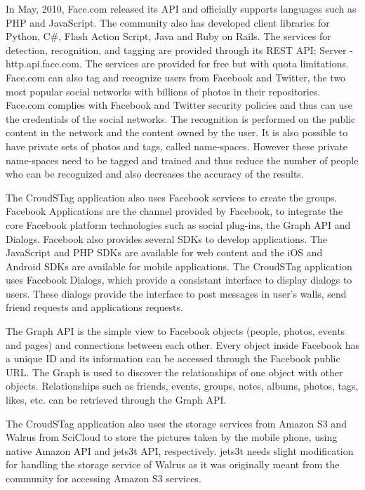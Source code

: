 In May, 2010, Face.com released its API and officially supports languages such as PHP and JavaScript. The community also has developed client libraries for Python, C\#, Flash Action Script, Java and Ruby on Rails. The services for detection, recognition, and tagging are provided through its REST API; Server - http.api.face.com. The services are provided for free but with quota limitations. Face.com can also tag and recognize users from Facebook and Twitter, the two most popular social networks with billions of photos in their repositories. Face.com complies with Facebook and Twitter security policies and thus can use the credentials of the social networks. The recognition is performed on the public content in the network and the content owned by the user. It is also possible to have private sets of photos and tags, called name-spaces. However these private name-spaces need to be tagged and trained and thus reduce the number of people who can be recognized and also decreases the accuracy of the results. 

The CroudSTag application also uses Facebook services to create the groups.  Facebook Applications are the channel provided by Facebook, to integrate the core Facebook platform technologies such as social plug-ins, the Graph API and Dialogs. Facebook also provides several SDKs to develop applications. The JavaScript and PHP SDKs are available for web content and the iOS and Android SDKs are available for mobile applications. The CroudSTag application uses Facebook Dialogs, which provide a consistant interface to display dialogs to users. These dialogs provide the interface to post messages in user's walls, send friend requests and applications requests. 

The Graph API is the simple view to Facebook objects (people, photos, events and pages) and connections between each other. Every object inside Facebook has a unique ID and its information can be accessed through the Facebook public URL. The Graph is used to discover the relationships of one object with other objects. Relationships such as friends, events, groups, notes, albums, photos, tags, likes, etc. can be retrieved through the Graph API. 

The CroudSTag application also uses the storage services from Amazon S3 and Walrus from SciCloud to store the pictures taken by the mobile phone, using native Amazon API and jets3t API, respectively. jets3t needs slight modification for handling the storage service of Walrus as it was originally meant from the community for accessing Amazon S3 services.

